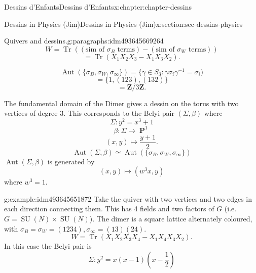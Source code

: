 \documentclass[oneside,10pt,]{book}
\numberwithin{equation}{section}
\newcommand{\inv}{^{-1}}
\newcommand{\ZZ}{\mathbf{Z}}
\DeclareMathOperator{\PP}{\mathbf{P}}
\DeclareMathOperator{\trace}{Tr}
\DeclareMathOperator{\Aut}{Aut}
\DeclareMathOperator{\specialunitary}{SU}
\begin{document}
\begin{chapterptx}{Dessins d'Enfants}{}{Dessins d'Enfants}{}{}{x:chapter:chapter-dessins}
\begin{sectionptx}{Dessins in Physics (Jim)}{}{Dessins in Physics (Jim)}{}{}{x:section:sec-dessins-physics}
\begin{paragraphs}{Quivers and dessins.}{g:paragraphs:idm493645669264}
\begin{equation*}
W = \trace((\text{sim of }\sigma_B\text{ terms}) - (\text{sim of }\sigma_W\text{ terms}))
\end{equation*}
%
\begin{equation*}
= \trace(X_1X_2X_3 - X_1X_3X_2)\text{.}
\end{equation*}
%
\par
%
\begin{equation*}
\Aut( \{\sigma_B,\sigma_W,\sigma_\infty\}) = \{ \gamma\in S_3: \gamma\sigma_i \gamma\inv = \sigma_i)
\end{equation*}
%
\begin{equation*}
= \{1,(123), (132)\}
\end{equation*}
%
\begin{equation*}
= \ZZ/3\ZZ\text{.}
\end{equation*}
%
\par
The fundamental domain of the Dimer gives a dessin on the torus with two vertices of degree 3. This corresponds to the Belyi pair \((\Sigma, \beta)\) where%
\begin{equation*}
\Sigma \colon y^2 = x^3 + 1
\end{equation*}
%
\begin{equation*}
\beta \colon \Sigma  \to \PP^1
\end{equation*}
%
\begin{equation*}
(x,y) \mapsto \frac{y+1}{2}\text{.}
\end{equation*}
%
\begin{equation*}
\Aut(\Sigma, \beta) \simeq \Aut(\{\sigma_B,\sigma_W, \sigma_\infty\})
\end{equation*}
\(\Aut(\Sigma, \beta)\) is generated by%
\begin{equation*}
(x,y) \mapsto (w^3 x,y)
\end{equation*}
where \(w^3 = 1\).%
\begin{example}{}{g:example:idm493645651872}%
Take the quiver with two vertices and two edges in each direction connecting them. This has 4 fields and two factors of \(G\) (i.e. \(G = \specialunitary (N) \times \specialunitary (N)\)). The dimer is a square lattice alternately coloured, with \(\sigma_B = \sigma_W = (1234), \sigma_\infty = (13)(24)\).%
\begin{equation*}
W = \trace (X_1X_2X_3X_4 - X_1 X_4 X_3 X_2)\text{.}
\end{equation*}
In this case the Belyi pair is%
\begin{equation*}
\Sigma \colon y^2= x(x-1)(x-\frac12)

\end{equation*}
\end{example}
\end{paragraphs}
\end{sectionptx}
\end{chapterptx}
\end{document}
